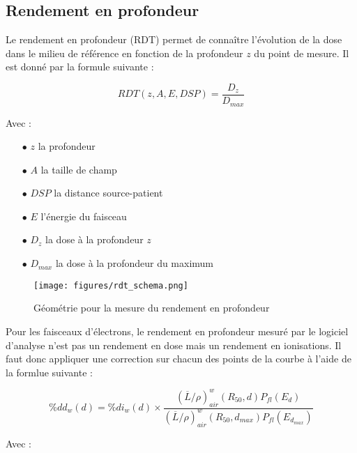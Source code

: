 \documentclass{article}
\begin{document}
\subsection{Rendement en profondeur}

Le rendement en profondeur (RDT) permet de connaître l'évolution de la dose dans le milieu de référence en fonction de la profondeur $z$ du point de mesure. Il est donné par la formule suivante :

\begin{equation}
  RDT(z, A, E, DSP) = \dfrac{D_z}{D_{max}}
  \label{eq_rdt}
\end{equation}

Avec :

\begin{itemize}
  \item[$\bullet$] $z$ la profondeur
  \item[$\bullet$] $A$ la taille de champ
  \item[$\bullet$] $DSP$ la distance source-patient
  \item[$\bullet$] $E$ l'énergie du faisceau
  \item[$\bullet$] $D_z$ la dose à la profondeur $z$
  \item[$\bullet$] $D_{max}$ la dose à la profondeur du maximum
\end{itemize}

\begin{figure}[h]
  \centering
  \texttt{[image: figures/rdt\_schema.png]}
  \caption{Géométrie pour la mesure du rendement en profondeur}
  \label{fig_rdt}
\end{figure}

\newpage
Pour les faisceaux d'électrons, le rendement en profondeur mesuré par le logiciel d'analyse n'est pas un rendement en dose mais un rendement en ionisations. Il faut donc appliquer une correction sur chacun des points de la courbe à l'aide de la formlue suivante \cite{fm1991clinical}\cite{gerbi2009recommendations} :

\begin{equation}
  \%dd_w(d) = \%di_w(d) \times \dfrac{(\overline{L}/\rho)^w_{air}(R_{50}, d) P_{fl}(E_d)}{(\overline{L}/\rho)^w_{air} (R_{50}, d_{max}) P_{fl}(E_{d_{max}})}
\end{equation}

Avec :
\end{document}
